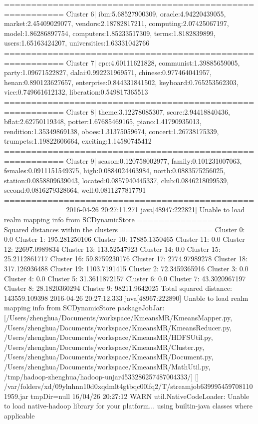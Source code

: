 ========================================================= 
Cluster 6| ibm:5.68527900309, oracle:4.94220439055, market:2.45409029077, vendors:2.18782817211, computing:2.07425067197, model:1.86286897754, computers:1.85233517309, terms:1.8182839899, users:1.65163424207, universities:1.63331042766
========================================================= 
Cluster 7| cpc:4.60111621828, communist:1.39885659005, party:1.09671522827, dalai:0.992231969571, chinese:0.977464041957, henan:0.890123627657, enterprise:0.844331841502, keyboard:0.765253562303, vice:0.749661612132, liberation:0.549817365513
========================================================= 
Cluster 8| theme:3.12278085307, score:2.94418840436, bflat:2.62750119348, potter:1.67685469165, piano:1.41790935013, rendition:1.35349869138, oboes:1.31375059674, concert:1.26738175339, trumpets:1.19822606664, exciting:1.14580745412
========================================================= 
Cluster 9| season:0.120758002977, family:0.101231007063, females:0.0911151549375, high:0.0884024463984, north:0.0883575256025, station:0.0858809639043, located:0.0857940445337, club:0.0846218099539, second:0.0816279328664, well:0.0811277817791
========================================================= 
2016-04-26 20:27:11.271 java[48947:222821] Unable to load realm mapping info from SCDynamicStore
=================== Squared distances within the clusters =================
Cluster 0: 0.0
Cluster 1: 195.281250106
Cluster 10: 17885.1350465
Cluster 11: 0.0
Cluster 12: 22697.0989834
Cluster 13: 113.52547923
Cluster 14: 0.0
Cluster 15: 25.2112861717
Cluster 16: 59.8759230176
Cluster 17: 2774.97989278
Cluster 18: 317.126936488
Cluster 19: 1103.7191415
Cluster 2: 72.3459365916
Cluster 3: 0.0
Cluster 4: 0.0
Cluster 5: 31.3611872157
Cluster 6: 0.0
Cluster 7: 43.3020967197
Cluster 8: 28.1820360294
Cluster 9: 98211.9642025
Total squared distance: 143559.109398
2016-04-26 20:27:12.333 java[48967:222890] Unable to load realm mapping info from SCDynamicStore
packageJobJar: [/Users/zhenghua/Documents/workspace/KmeansMR/KmeansMapper.py, /Users/zhenghua/Documents/workspace/KmeansMR/KmeansReducer.py, /Users/zhenghua/Documents/workspace/KmeansMR/HDFSUtil.py, /Users/zhenghua/Documents/workspace/KmeansMR/Cluster.py, /Users/zhenghua/Documents/workspace/KmeansMR/Document.py, /Users/zhenghua/Documents/workspace/KmeansMR/MathUtil.py, /tmp/hadoop-zhenghua/hadoop-unjar4533286257487004333/] [] /var/folders/xd/09ylnhnn10d0xqdmlt4gtbqc00lfq2/T/streamjob6399954597081101959.jar tmpDir=null
16/04/26 20:27:12 WARN util.NativeCodeLoader: Unable to load native-hadoop library for your platform... using builtin-java classes where applicable
